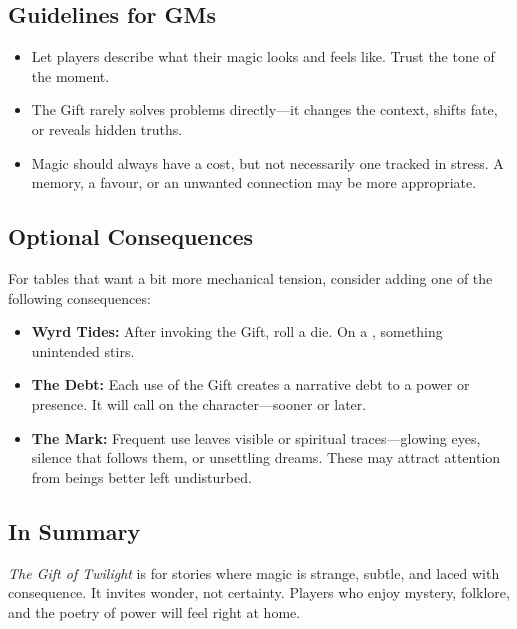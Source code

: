 \subsection{Guidelines for GMs}

\begin{itemize}
    \item Let players describe what their magic looks and feels like. Trust the tone of the moment.
    \item The Gift rarely solves problems directly—it changes the context, shifts fate, or reveals hidden truths.
    \item Magic should always have a cost, but not necessarily one tracked in stress. A memory, a favour, or an unwanted connection may be more appropriate.
\end{itemize}

\subsection{Optional Consequences}

For tables that want a bit more mechanical tension, consider adding one of the following consequences:

\begin{itemize}
    \item \textbf{Wyrd Tides:} After invoking the Gift, roll a die. On a \FudgeDie{-}, something unintended stirs.
    \item \textbf{The Debt:} Each use of the Gift creates a narrative debt to a power or presence. It will call on the character—sooner or later.
    \item \textbf{The Mark:} Frequent use leaves visible or spiritual traces—glowing eyes, silence that follows them, or unsettling dreams. These may attract attention from beings better left undisturbed.
\end{itemize}

\subsection{In Summary}

\textit{The Gift of Twilight} is for stories where magic is strange, subtle, and laced with consequence. It invites wonder, not certainty. Players who enjoy mystery, folklore, and the poetry of power will feel right at home.
